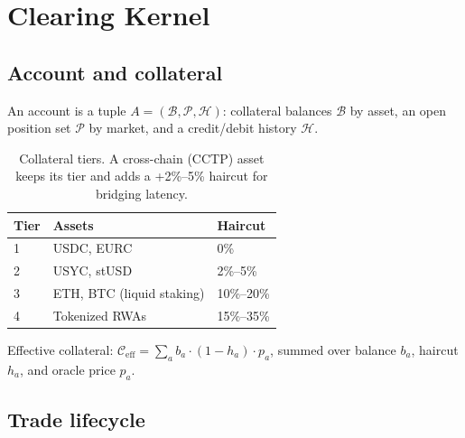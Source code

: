 \documentclass[11pt,a4paper]{article}
\begin{document}
\section{Clearing Kernel}
\label{sec:clearing}

\subsection{Account and collateral}

An account is a tuple $A = (\mathcal{B}, \mathcal{P}, \mathcal{H})$: collateral balances $\mathcal{B}$ by asset, an open position set $\mathcal{P}$ by market, and a credit/debit history $\mathcal{H}$.

\begin{table}[h]
  \centering
  \begin{tabular}{lll}
    \toprule
    \textbf{Tier} & \textbf{Assets} & \textbf{Haircut} \\
    \midrule
    1 & USDC, EURC & 0\% \\
    2 & USYC, stUSD & 2\%--5\% \\
    3 & ETH, BTC (liquid staking) & 10\%--20\% \\
    4 & Tokenized RWAs & 15\%--35\% \\
    \bottomrule
  \end{tabular}
  \caption{Collateral tiers. A cross-chain (CCTP) asset keeps its tier and adds a +2\%--5\% haircut for bridging latency.}
  \label{tab:collateral}
\end{table}

Effective collateral: $\mathcal{C}_{\text{eff}} = \sum_{a} b_a \cdot (1 - h_a) \cdot p_a$, summed over balance $b_a$, haircut $h_a$, and oracle price $p_a$.

\subsection{Trade lifecycle}
\end{document}
